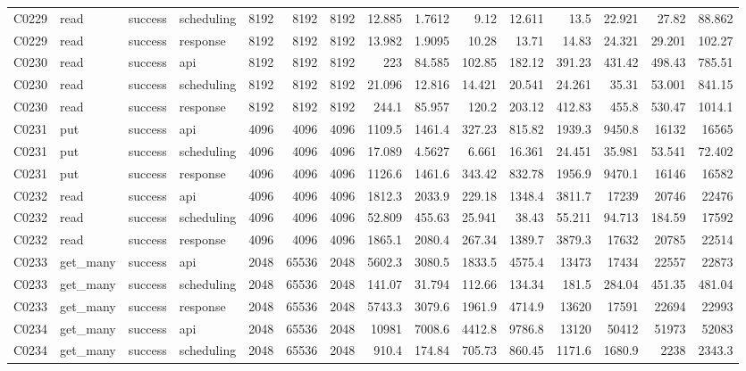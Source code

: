 \begin{landscape}
\begin{longtable}{llllrrrrrrrrrrr}
C0229 & read & success & scheduling & 8192 & 8192 & 8192 & 12.885 & 1.7612 & 9.12 & 12.611 & 13.5 & 22.921 & 27.82 & 88.862\\
C0229 & read & success & response & 8192 & 8192 & 8192 & 13.982 & 1.9095 & 10.28 & 13.71 & 14.83 & 24.321 & 29.201 & 102.27\\
C0230 & read & success & api & 8192 & 8192 & 8192 & 223 & 84.585 & 102.85 & 182.12 & 391.23 & 431.42 & 498.43 & 785.51\\
C0230 & read & success & scheduling & 8192 & 8192 & 8192 & 21.096 & 12.816 & 14.421 & 20.541 & 24.261 & 35.31 & 53.001 & 841.15\\
C0230 & read & success & response & 8192 & 8192 & 8192 & 244.1 & 85.957 & 120.2 & 203.12 & 412.83 & 455.8 & 530.47 & 1014.1\\
C0231 & put & success & api & 4096 & 4096 & 4096 & 1109.5 & 1461.4 & 327.23 & 815.82 & 1939.3 & 9450.8 & 16132 & 16565\\
C0231 & put & success & scheduling & 4096 & 4096 & 4096 & 17.089 & 4.5627 & 6.661 & 16.361 & 24.451 & 35.981 & 53.541 & 72.402\\
C0231 & put & success & response & 4096 & 4096 & 4096 & 1126.6 & 1461.6 & 343.42 & 832.78 & 1956.9 & 9470.1 & 16146 & 16582\\
C0232 & read & success & api & 4096 & 4096 & 4096 & 1812.3 & 2033.9 & 229.18 & 1348.4 & 3811.7 & 17239 & 20746 & 22476\\
C0232 & read & success & scheduling & 4096 & 4096 & 4096 & 52.809 & 455.63 & 25.941 & 38.43 & 55.211 & 94.713 & 184.59 & 17592\\
C0232 & read & success & response & 4096 & 4096 & 4096 & 1865.1 & 2080.4 & 267.34 & 1389.7 & 3879.3 & 17632 & 20785 & 22514\\
C0233 & get\_\allowbreak{}many & success & api & 2048 & 65536 & 2048 & 5602.3 & 3080.5 & 1833.5 & 4575.4 & 13473 & 17434 & 22557 & 22873\\
C0233 & get\_\allowbreak{}many & success & scheduling & 2048 & 65536 & 2048 & 141.07 & 31.794 & 112.66 & 134.34 & 181.5 & 284.04 & 451.35 & 481.04\\
C0233 & get\_\allowbreak{}many & success & response & 2048 & 65536 & 2048 & 5743.3 & 3079.6 & 1961.9 & 4714.9 & 13620 & 17591 & 22694 & 22993\\
C0234 & get\_\allowbreak{}many & success & api & 2048 & 65536 & 2048 & 10981 & 7008.6 & 4412.8 & 9786.8 & 13120 & 50412 & 51973 & 52083\\
C0234 & get\_\allowbreak{}many & success & scheduling & 2048 & 65536 & 2048 & 910.4 & 174.84 & 705.73 & 860.45 & 1171.6 & 1680.9 & 2238 & 2343.3\\

\end{longtable}
\end{landscape}
